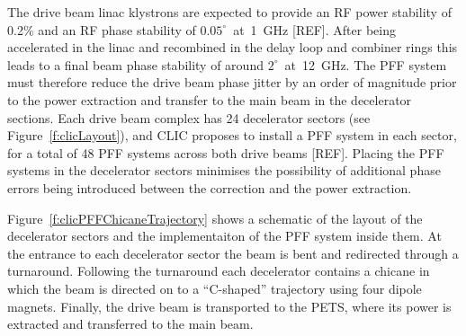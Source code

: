 The drive beam linac klystrons are expected to provide an RF power stability of 0.2\% and an RF phase stability of \(0.05^\circ\)~at~1~GHz [REF]. After being accelerated in the linac and recombined in the delay loop and combiner rings this leads to a final beam phase stability of around \(2^\circ\)~at~12~GHz. The PFF system must therefore reduce the drive beam phase jitter by an order of magnitude prior to the power extraction and transfer to the main beam in the decelerator sections. Each drive beam complex has 24 decelerator sectors (see Figure~\ref{f:clicLayout}), and CLIC proposes to install a PFF system in each sector, for a total of 48 PFF systems across both drive beams [REF]. Placing the PFF systems in the decelerator sectors minimises the possibility of additional phase errors being introduced between the correction and the power extraction.


Figure~\ref{f:clicPFFChicaneTrajectory} shows a schematic of the layout of the decelerator sectors and the implementaiton of the PFF system inside them. At the entrance to each decelerator sector the beam is bent and redirected through a turnaround. Following the turnaround each decelerator contains a chicane in which the beam is directed on to a ``C-shaped'' trajectory using four dipole magnets. Finally, the drive beam is transported to the PETS, where its power is extracted and transferred to the main beam.

